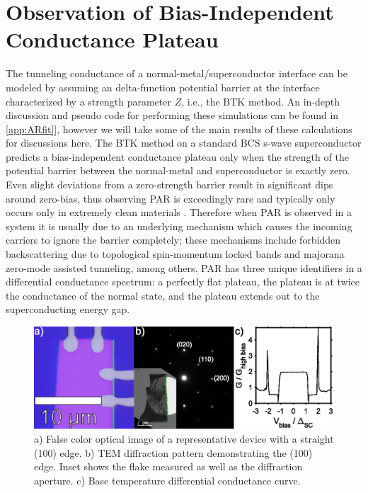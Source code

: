 \section{Observation of Bias-Independent Conductance Plateau}
The tunneling conductance of a normal-metal/superconductor interface can be modeled by assuming an delta-function potential barrier at the interface characterized by a strength parameter $Z$, i.e., the \ac{BTK} method. An in-depth discussion and pseudo code for performing these simulations can be found in \ref{app:ARfit}], however we will take some of the main results of these calculations for discussions here. The \ac{BTK} method on a standard \ac{BCS} s-wave superconductor predicts a bias-independent conductance plateau only when the strength of the potential barrier between the normal-metal and superconductor is exactly zero. Even slight deviations from a zero-strength barrier result in significant dips around zero-bias, thus observing \ac{PAR} is exceedingly rare and typically only occurs only in extremely clean materials . Therefore when \ac{PAR} is observed in a system it is usually due to an underlying mechanism which causes the incoming carriers to ignore the barrier completely; these mechanisms include forbidden backscattering due to topological spin-momentum locked bands and majorana zero-mode assisted tunneling, among others. \ac{PAR} has three unique identifiers in a differential conductance spectrum: a perfectly flat plateau, the plateau is at twice the conductance of the normal state, and the plateau extends out to the superconducting energy gap.\par
\begin{figure}
    \centering
    \includegraphics[width = \textwidth]{Chap4/Figures/DeviceFab.eps}
    \caption{a) False color optical image of a representative device with a straight (100) edge. b) \ac{TEM} diffraction pattern demonstrating the (100) edge. Inset shows the flake measured as well as the diffraction aperture. c) Base temperature differential conductance curve.}
    \label{fig:PARDeviceFab}
\end{figure}
